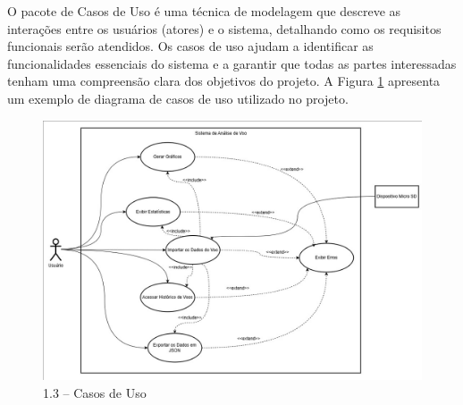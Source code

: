 \begin{samepage}

O pacote de Casos de Uso é uma técnica de modelagem que descreve as interações entre os usuários (atores) e o sistema, detalhando como os requisitos funcionais serão atendidos. Os casos de uso ajudam a identificar as funcionalidades essenciais do sistema e a garantir que todas as partes interessadas tenham uma compreensão clara dos objetivos do projeto. A Figura \ref{fig_casos_de_uso} apresenta um exemplo de diagrama de casos de uso utilizado no projeto.
\begin{figure}[H]
	\centering
	\includegraphics[width=15cm]{figuras/caso_de_uso.png}
	\caption{1.3 – Casos de Uso}
	\label{fig_casos_de_uso}
\end{figure}
\end{samepage}


